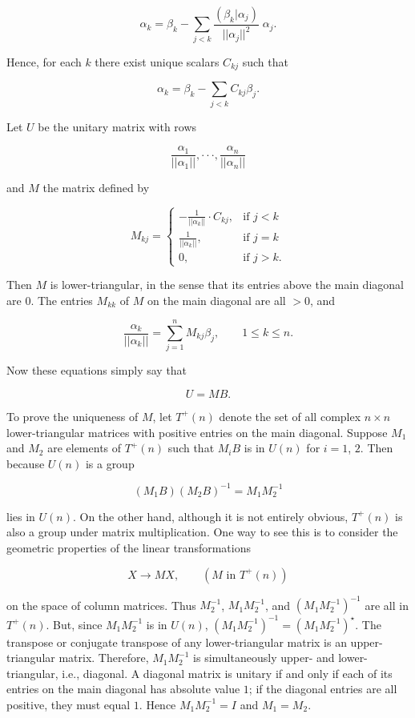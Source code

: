 \[\alpha_{k}=\beta_{k}-\sum\limits_{j<k}\frac{(\beta_{k}|\alpha_{j})}{||\alpha_{j}||^ {2}}\;\alpha_{j}.\]

Hence, for each \(k\) there exist unique scalars \(C_{kj}\) such that

\[\alpha_{k}=\beta_{k}-\sum\limits_{j<k}C_{kj}\beta_{j}.\]

Let \(U\) be the unitary matrix with rows

\[\frac{\alpha_{1}}{||\alpha_{1}||},\cdot\cdot\cdot,\frac{\alpha_{n}}{||\alpha_ {n}||}\]

and \(M\) the matrix defined by

\[M_{kj}=\begin{cases}-\frac{1}{||\alpha_{k}||}\cdot C_{kj},&\text{if $j<k$}\\ \frac{1}{||\alpha_{k}||},&\text{if $j=k$}\\ 0,&\text{if $j>k$}.\end{cases}\]

Then \(M\) is lower-triangular, in the sense that its entries above the main diagonal are \(0\). The entries \(M_{kk}\) of \(M\) on the main diagonal are all \(>0\), and

\[\frac{\alpha_{k}}{||\alpha_{k}||}=\sum\limits_{j=1}^{n}M_{kj}\beta_{j},\qquad 1 \leq k\leq n.\]

Now these equations simply say that

\[U=MB.\]

To prove the uniqueness of \(M\), let \(T^{+}(n)\) denote the set of all complex \(n\times n\) lower-triangular matrices with positive entries on the main diagonal. Suppose \(M_{1}\) and \(M_{2}\) are elements of \(T^{+}(n)\) such that \(M_{i}B\) is in \(U(n)\) for \(i=1\), \(2\). Then because \(U(n)\) is a group

\[(M_{1}B)(M_{2}B)^{-1}=M_{1}M_{2}^{-1}\]

lies in \(U(n)\). On the other hand, although it is not entirely obvious, \(T^{+}(n)\) is also a group under matrix multiplication. One way to see this is to consider the geometric properties of the linear transformations

\[X\xrightarrow{}MX,\qquad(M\text{ in }T^{+}(n))\]

on the space of column matrices. Thus \(M_{2}^{-1}\), \(M_{1}M_{2}^{-1}\), and \((M_{1}M_{2}^{-1})^{-1}\) are all in \(T^{+}(n)\). But, since \(M_{1}M_{2}^{-1}\) is in \(U(n)\), \((M_{1}M_{2}^{-1})^{-1}=(M_{1}M_{2}^{-1})^{\star}\). The transpose or conjugate transpose of any lower-triangular matrix is an upper-triangular matrix. Therefore, \(M_{1}M_{2}^{-1}\) is simultaneously upper- and lower-triangular, i.e., diagonal. A diagonal matrix is unitary if and only if each of its entries on the main diagonal has absolute value \(1\); if the diagonal entries are all positive, they must equal \(1\). Hence \(M_{1}M_{2}^{-1}=I\) and \(M_{1}=M_{2}\).

 